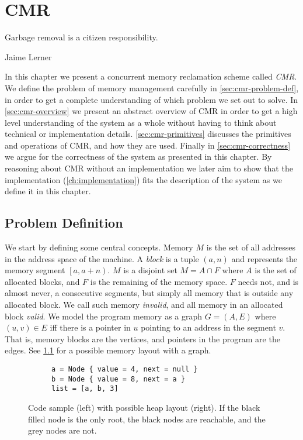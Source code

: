 \chapter{CMR\label{ch:cmr}}
\epigraph{Garbage removal is a citizen responsibility.}{Jaime Lerner}

In this chapter we present a concurrent memory reclamation scheme called \emph{CMR}.  We define the
problem of memory management carefully in \cref{sec:cmr-problem-def}, in order to get a complete
understanding of which problem we set out to solve.  In \cref{sec:cmr-overview} we present an
abstract overview of CMR in order to get a high level understanding of the system as a whole
without having to think about technical or implementation details.  \cref{sec:cmr-primitives}
discusses the primitives and operations of CMR, and how they are used.  Finally in
\cref{sec:cmr-correctness} we argue for the correctness of the system as presented in this chapter.
By reasoning about CMR without an implementation we later aim to show that the implementation
(\cref{ch:implementation}) fits the description of the system as we define it in this chapter.


\clearpage

\section{Problem Definition\label{sec:cmr-problem-def}}

We start by defining some central concepts. Memory $M$ is the set of all addresses in the address
space of the machine. A \emph{block} is a tuple $(a, n)$ and represents the memory segment
$\left[a, a + n\right)$. $M$ is a disjoint set $M = A \cap F$ where $A$ is the set of allocated
blocks, and $F$ is the remaining of the memory space. $F$ needs not, and is almost never, a
consecutive segments, but simply all memory that is outside any allocated block. We call such
memory \emph{invalid}, and all memory in an allocated block \emph{valid}.  We model the program
memory as a graph $G = (A, E)$ where $(u, v) \in E$ iff there is a pointer in $u$ pointing to an
address in the segment $v$. That is, memory blocks are the vertices, and pointers in the program
are the edges. See \cref{fig:memory-graph} for a possible memory layout with a graph.

\begin{figure}[ht]
  \centering
  \begin{subfigure}{0.45\textwidth}
    \begin{lstlisting}[style=Rust]
a = Node { value = 4, next = null }
b = Node { value = 8, next = a }
list = [a, b, 3]
    \end{lstlisting}
  \end{subfigure}
  \hfill
  \begin{subfigure}{0.45\textwidth}
    
  \end{subfigure}
  \caption{Code sample (left) with possible heap layout (right). If the black filled node is the
  only root, the black nodes are reachable, and the grey nodes are not.\label{fig:memory-graph}}
\end{figure}


